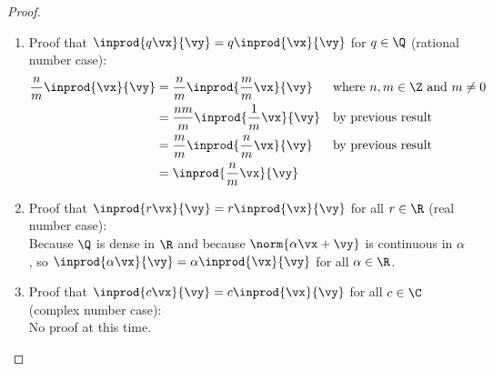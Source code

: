 \begin{proof}
\begin{enumerate}
\begin{enumerate}
\begin{enumerate}
\begin{enumerate}
            \item Proof that [$n$ case] $\implies$ [$n\pm1$ case]:
              \begin{align*}
                \inprod{(n\pm1)\vx}{\vy}
                  &= \inprod{n\vx \pm1\vx}{\vy}
                \\&= \inprod{n\vx}{\vy} + \inprod{\pm1\vx}{\vy}
                  && \text{by additive property}
                \\&= n\inprod{\vx}{\vy} \pm1 \inprod{\vx}{\vy}
                  && \text{by left hypothesis}
                \\&= (n\pm1)\inprod{\vx}{\vy}
              \end{align*}
          \end{enumerate}

        \item Proof that $\inprod{q\vx}{\vy}=q\inprod{\vx}{\vy}$ for $q\in\Q$ (rational number case):
          \begin{align*}
            \frac{n}{m}\inprod{\vx}{\vy}
              &= \frac{n}{m}\inprod{\frac{m}{m}\vx}{\vy}
              && \text{where $n,m\in\Z$ and $m\ne 0$}
            \\&= \frac{nm}{m}\inprod{\frac{1}{m}\vx}{\vy}
              && \text{by previous result}
            \\&= \frac{m}{m}\inprod{\frac{n}{m}\vx}{\vy}
              && \text{by previous result}
            \\&= \inprod{\frac{n}{m}\vx}{\vy}
          \end{align*}

        \item Proof that $\inprod{r\vx}{\vy}=r\inprod{\vx}{\vy}$ for all $r\in\R$ (real number case):\\
          Because $\Q$ is dense in $\R$ and because $\norm{\alpha\vx+\vy}$ is
          continuous in $\alpha$,
          so $\inprod{\alpha\vx}{\vy}=\alpha\inprod{\vx}{\vy}$ for all $\alpha\in\R$.

        \item Proof that $\inprod{c\vx}{\vy}=c\inprod{\vx}{\vy}$ for all $c\in\C$ (complex number case):\\
          No proof at this time. \attention
      \end{enumerate}
    \end{enumerate}
  \end{enumerate}
\end{proof}

